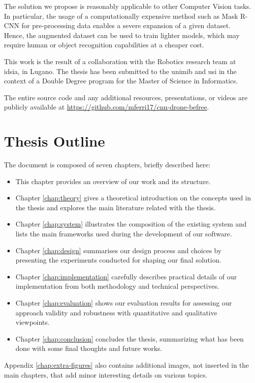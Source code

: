 The solution we propose is reasonably applicable to other Computer Vision tasks. In particular, the usage of a computationally expensive method such as Mask R-CNN for pre-processing data enables a severe expansion of a given dataset. Hence, the augmented dataset can be used to train lighter models, which may require human or object recognition capabilities at a cheaper cost.

\clearpage

This work is the result of a collaboration with the Robotics research team at \gls{idsia}, in Lugano. The thesis has been submitted to the \gls{unimib} and \gls{usi} in the context of a Double Degree program for the Master of Science in Informatics.

The entire source code and any additional resources, presentations, or videos are publicly available at \url{https://github.com/mferri17/cnn-drone-befree}.




\section*{Thesis Outline}
\label{sec:outline}

The document is composed of seven chapters, briefly described here:

\begin{itemize}
	\item This chapter provides an overview of our work and its structure.
	\item Chapter \ref{chap:theory} gives a theoretical introduction on the concepts used in the thesis and explores the main literature related with the thesis.
	\item Chapter \ref{chap:system} illustrates the composition of the existing system and lists the main frameworks used during the development of our software.
	\item Chapter \ref{chap:design} summarises our design process and choices by presenting the experiments conducted for shaping our final solution.
	\item Chapter \ref{chap:implementation} carefully describes practical details of our implementation from both methodology and technical perspectives.
	\item Chapter \ref{chap:evaluation} shows our evaluation results for assessing our approach validity and robustness with quantitative and qualitative viewpoints.
	\item Chapter \ref{chap:conclusion} concludes the thesis, summarizing what has been done with some final thoughts and future works.
\end{itemize}

Appendix \ref{chap:extra-figures} also contains additional images, not inserted in the main chapters, that add minor interesting details on various topics.





